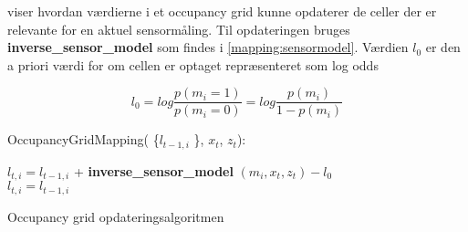  viser hvordan værdierne i et occupancy grid kunne opdaterer de celler der er relevante for en aktuel sensormåling. 
Til opdateringen bruges \textbf{inverse\_sensor\_model} som findes i \cref{mapping:sensormodel}. 
Værdien $ l_0 $ er den a priori værdi for om cellen er optaget repræsenteret som log odds

\begin{equation}
  l_0 =  log \frac{p(m_i = 1)}{p(m_i = 0)} = log \frac{p(m_i)}{1- p(m_i)}
\end{equation} 

\begin{algorithm}[H]
\LinesNumbered
OccupancyGridMapping( \{$ l_{t-1,i} $ \}, $ x_t $, $ z_t $):

{
{ $ l_{t,i} = l_{t-1,i} $ + \textbf{inverse\_sensor\_model} $( m_i, x_t, z_t ) - l_0$\\ }
{ $ l_{t,i} = l_{t-1,i}  $\\ }
}
\caption{Occupancy grid opdateringsalgoritmen}\label{occupancygrid:alg}
\end{algorithm}




